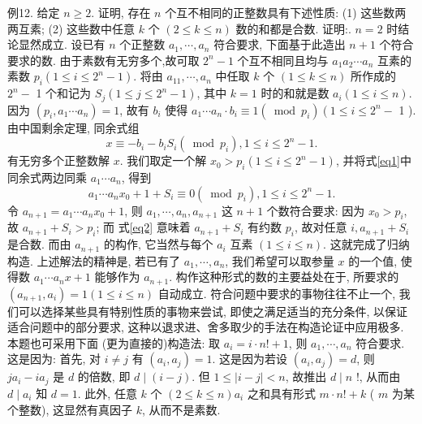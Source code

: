 例12. 给定 $n \geqslant 2$. 证明, 存在 $n$ 个互不相同的正整数具有下述性质:
(1) 这些数两两互素;
(2) 这些数中任意 $k$ 个 $(2 \leqslant k \leqslant n)$ 数的和都是合数.
证明:.
$n=2$ 时结论显然成立.
设已有 $n$ 个正整数 $a_1, \cdots, a_n$ 符合要求, 下面基于此造出 $n+1$ 个符合要求的数.
由于素数有无穷多个,故可取 $2^n-1$ 个互不相同且均与 $a_1 a_2 \cdots a_n$ 互素的素数 $p_i\left(1 \leqslant i \leqslant 2^n-1\right)$. 将由 $a_{11}, \cdots, a_n$ 中任取 $k$ 个 $(1 \leqslant k \leqslant n)$ 所作成的 $2^n-$ 1 个和记为 $S_j\left(1 \leqslant j \leqslant 2^n-1\right)$, 其中 $k=1$ 时的和就是数 $a_i(1 \leqslant i \leqslant n)$.
因为 $\left(p_i, a_1 \cdots a_n\right)=1$, 故有 $b_i$ 使得 $a_1 \cdots a_n \cdot b_i \equiv 1\left(\bmod p_i\right)\left(1 \leqslant i \leqslant 2^n-\right.$ 1 ). 由中国剩余定理, 同余式组
$$
x \equiv-b_i-b_i S_i\left(\bmod p_i\right), 1 \leqslant i \leqslant 2^n-1 . \label{eq1}
$$
有无穷多个正整数解 $x$. 我们取定一个解 $x_0>p_i\left(1 \leqslant i \leqslant 2^n-1\right)$, 并将式\ref{eq1}中同余式两边同乘 $a_1 \cdots a_n$, 得到
$$
a_1 \cdots a_n x_0+1+S_i \equiv 0\left(\bmod p_i\right), 1 \leqslant i \leqslant 2^n-1 . \label{eq2}
$$
令 $a_{n+1}=a_1 \cdots a_n x_0+1$, 则 $a_1, \cdots, a_n, a_{n+1}$ 这 $n+1$ 个数符合要求: 因为 $x_0> p_i$, 故 $a_{n+1}+S_i>p_i$; 而 式\ref{eq2} 意味着 $a_{n+1}+S_i$ 有约数 $p_i$, 故对任意 $i, a_{n+1}+S_i$ 是合数.
而由 $a_{n+1}$ 的构作, 它当然与每个 $a_i$ 互素 $(1 \leqslant i \leqslant n)$. 这就完成了归纳构造.
上述解法的精神是, 若已有了 $a_1, \cdots, a_n$, 我们希望可以取参量 $x$ 的一个值, 使得数 $a_1 \cdots a_n x+1$ 能够作为 $a_{n+1}$. 构作这种形式的数的主要益处在于, 所要求的 $\left(a_{n+1}, a_i\right)=1(1 \leqslant i \leqslant n)$ 自动成立.
符合问题中要求的事物往往不止一个, 我们可以选择某些具有特别性质的事物来尝试, 即使之满足适当的充分条件, 以保证适合问题中的部分要求, 这种以退求进、舍多取少的手法在构造论证中应用极多.
本题也可采用下面 (更为直接的)构造法: 取 $a_i=i \cdot n !+1$, 则 $a_1, \cdots, a_n$ 符合要求.
这是因为:
首先, 对 $i \neq j$ 有 $\left(a_i, a_j\right)=1$. 这是因为若设 $\left(a_i, a_j\right)=d$, 则 $j a_i-i a_j$ 是 $d$ 的倍数, 即 $d \mid(i-j)$. 但 $1 \leqslant|i-j|<n$, 故推出 $d \mid n$ !, 从而由 $d \mid a_i$ 知 $d=1$.
此外, 任意 $k$ 个 $(2 \leqslant k \leqslant n) a_i$ 之和具有形式 $m \cdot n !+k$ ( $m$ 为某个整数), 这显然有真因子 $k$, 从而不是素数.



